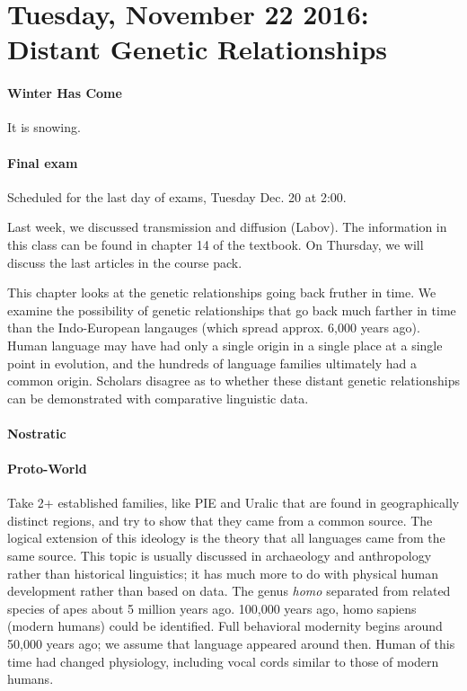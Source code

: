 \documentclass{exam}
\begin{document}
\section*{Tuesday, November 22 2016: Distant Genetic Relationships}

\paragraph{Winter Has Come} It is snowing. 

\paragraph{Final exam} Scheduled for the last day of exams, Tuesday Dec. 20 at 2:00. 

\noindent Last week, we discussed transmission and diffusion (Labov). The information in this class can be found in chapter 14 of the textbook. 
On Thursday, we will discuss the last articles in the course pack. 


This chapter looks at the genetic relationships going back fruther in time. 
We examine the possibility of genetic relationships that go back much farther in time than the Indo-European langauges (which spread approx. 6,000 years ago). 
Human language may have had only a single origin in a single place at a single point in evolution, and the hundreds of language families ultimately had a common origin. 
Scholars disagree as to whether these distant genetic relationships can be demonstrated with comparative linguistic data. 

\paragraph{Nostratic}
\paragraph{Proto-World}


\noindent Take 2+ established families, like PIE and Uralic that are found in geographically distinct regions, and try to show that they came from a common source.
The logical extension of this ideology is the theory that all languages came from the same source. 
This topic is usually discussed in archaeology and anthropology rather than historical linguistics; it has much more to do with physical human development rather than based on data. 
The genus \textit{homo} separated from related species of apes about 5 million years ago.
100,000 years ago, homo sapiens (modern humans) could be identified. 
Full behavioral modernity begins around 50,000 years ago; we assume that language appeared around then.
Human of this time had changed physiology, including vocal cords similar to those of modern humans. \\
\end{document}
